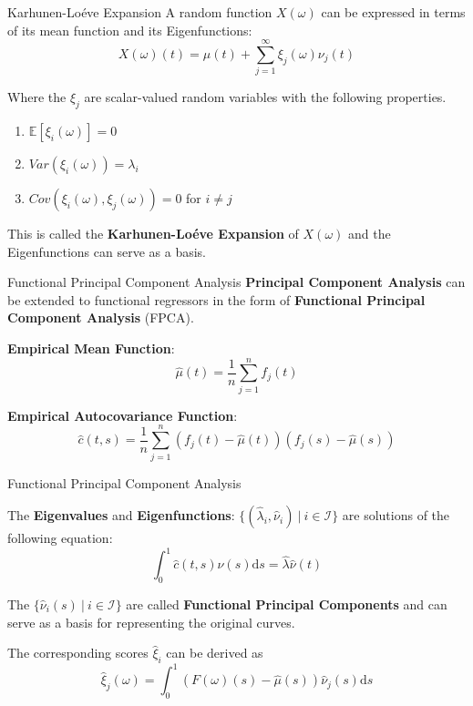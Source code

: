 \documentclass{beamer}
\begin{document}
	\begin{frame}{Karhunen-Lo\'{e}ve Expansion}\label{KLE}
		A random function $X(\omega)$ can be expressed in terms of its mean function and its Eigenfunctions:
		$$X(\omega)(t) = \mu(t) + \sum_{j = 1}^{\infty} \xi_j(\omega) \nu_j(t)$$
		
		Where the $\xi_j$ are scalar-valued random variables with the following properties.
		\begin{multicols}{2}
			\begin{enumerate}
				\item $\mathbb{E}[\xi_i(\omega)] = 0$
				\item $Var(\xi_i(\omega)) = \lambda_i$
				\item $Cov(\xi_i(\omega), \xi_j(\omega)) = 0$ for $i \neq j$
			\end{enumerate}
		\end{multicols}
		
		This is called the \textbf{Karhunen-Lo\'{e}ve Expansion} of $X(\omega)$ and the Eigenfunctions can serve as a basis. \\
		
		\hyperlink{spectral}{}
	\end{frame}

	\begin{frame}{Functional Principal Component Analysis}
		\textbf{Principal Component Analysis} can be extended to functional regressors in the form of \textbf{Functional Principal Component Analysis} (FPCA).
		\vspace{0.4cm}
		
		\textbf{Empirical Mean Function}:
		$$\hat{\mu}(t) = \frac{1}{n}\sum_{j = 1}^{n}f_j(t)$$

		\textbf{Empirical Autocovariance Function}:
		$$\hat{c}(t,s) = \frac{1}{n} \sum_{j = 1}^{n} \left(f_j(t) - \hat{\mu}(t)\right) \left(f_j(s) - \hat{\mu}(s)\right)$$

	\end{frame}

	\begin{frame}{Functional Principal Component Analysis}\label{FPCA}
	
		The \textbf{Eigenvalues} and \textbf{Eigenfunctions}: $\{(\hat{\lambda}_i, \hat{\nu}_i) \: \vert \: i \in \mathcal{I}\}$  are solutions of the following equation:
		$$ \int_{0}^{1}\hat{c}(t,s)\hat{\nu}(s) \mathrm{d}s = \hat{\lambda} \hat{\nu}(t) $$
		\vspace{0.2cm}
		
		The $\{\hat{\nu}_i(s) \: \vert \: i \in \mathcal{I}\}$ are called \textbf{Functional Principal Components} and can serve as a basis for representing the original curves. 
		\vspace{0.2cm}
		
		The corresponding scores $\hat{\xi}_i$ can be derived as
		$$\hat{\xi}_j(\omega) = \int_{0}^{1} (F(\omega)(s) - \hat{\mu}(s)) \hat{\nu}_j(s) \mathrm{d}s$$
		
		\hyperlink{PCA}{}
	\end{frame}
\end{document}
